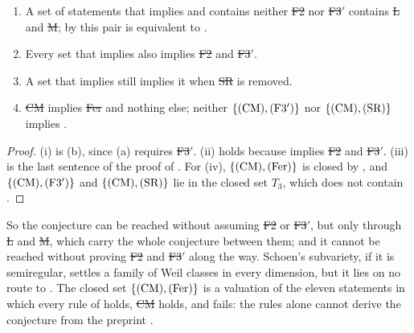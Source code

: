 \begin{corollary}\label{cor:bypass}
\begin{enumerate}[label=\textup{(\roman*)}]
\item A set of statements that implies \HC{} and contains neither \st{F2}
nor \st{F3$'$} contains \st{L} and \st{M}; by  this pair is
equivalent to \HC.
\item Every set that implies \HC{} also implies \st{F2} and \st{F3$'$}.
\item A set that implies \HC{} still implies it when \st{SR} is removed.
\item \st{CM} implies \st{Fer} and nothing else; neither
$\{\textup{(CM)},\textup{(F3$'$)}\}$ nor $\{\textup{(CM)},\textup{(SR)}\}$ implies \HC.
\end{enumerate}
\end{corollary}

\begin{proof}
(i) is (b), since (a) requires \st{F3$'$}. (ii) holds because
\HC{} implies \st{F2} and \st{F3$'$}. (iii) is the last sentence of the proof
of . For (iv), $\{\textup{(CM)},\textup{(Fer)}\}$ is closed by
, and $\{\textup{(CM)},\textup{(F3$'$)}\}$ and $\{\textup{(CM)},\textup{(SR)}\}$
lie in the closed set $T_{3}$, which does not contain \HC.
\end{proof}

So the conjecture can be reached without assuming \st{F2} or \st{F3$'$},
but only through \st{L} and \st{M}, which carry the whole conjecture between
them; and it cannot be reached without proving \st{F2} and \st{F3$'$} along
the way. Schoen's subvariety, if it is semiregular, settles a family of Weil
classes in every dimension, but it lies on no route to \HC. The closed set
$\{\textup{(CM)},\textup{(Fer)}\}$ is a valuation of the eleven statements in which
every rule of  holds, \st{CM} holds, and \HC{} fails: the
rules alone cannot derive the conjecture from the preprint \cite{OAI26}.
